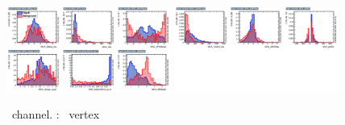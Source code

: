 \begin{figure}[htbp]
	\includegraphics[width=0.48\textwidth]{6_Search/Figures/MVAtechnics/singletopzut/uuu/variables_id_c1.png}
	\includegraphics[width=0.48\textwidth]{6_Search/Figures/MVAtechnics/singletopzut/uuu/variables_id_c2.png}
	\caption{\mumumu\ channel. \STSR: \Zut\ vertex }
	\label{image:Figuresuuusingletopzut}
\end{figure}
